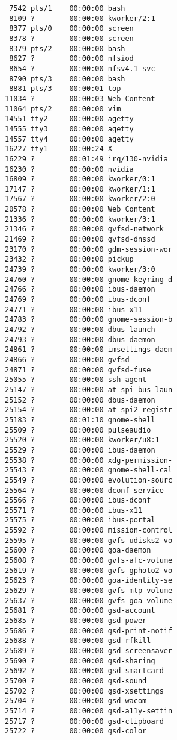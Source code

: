 \documentclass[a4paper]{article}
\begin{document}
\begin{figure}
\begin{verbatim}
 7542 pts/1    00:00:00 bash
 8109 ?        00:00:00 kworker/2:1
 8377 pts/0    00:00:00 screen
 8378 ?        00:00:00 screen
 8379 pts/2    00:00:00 bash
 8627 ?        00:00:00 nfsiod
 8654 ?        00:00:00 nfsv4.1-svc
 8790 pts/3    00:00:00 bash
 8881 pts/3    00:00:01 top
11034 ?        00:00:03 Web Content
11064 pts/2    00:00:00 vim
14551 tty2     00:00:00 agetty
14555 tty3     00:00:00 agetty
14557 tty4     00:00:00 agetty
16227 tty1     00:00:24 X
16229 ?        00:01:49 irq/130-nvidia
16230 ?        00:00:00 nvidia
16809 ?        00:00:00 kworker/0:1
17147 ?        00:00:00 kworker/1:1
17567 ?        00:00:00 kworker/2:0
20578 ?        00:00:00 Web Content
21336 ?        00:00:00 kworker/3:1
21346 ?        00:00:00 gvfsd-network
21469 ?        00:00:00 gvfsd-dnssd
23170 ?        00:00:00 gdm-session-wor
23432 ?        00:00:00 pickup
24739 ?        00:00:00 kworker/3:0
24760 ?        00:00:00 gnome-keyring-d
24766 ?        00:00:00 ibus-daemon
24769 ?        00:00:00 ibus-dconf
24771 ?        00:00:00 ibus-x11
24783 ?        00:00:00 gnome-session-b
24792 ?        00:00:00 dbus-launch
24793 ?        00:00:00 dbus-daemon
24861 ?        00:00:00 imsettings-daem
24866 ?        00:00:00 gvfsd
24871 ?        00:00:00 gvfsd-fuse
25055 ?        00:00:00 ssh-agent
25147 ?        00:00:00 at-spi-bus-laun
25152 ?        00:00:00 dbus-daemon
25154 ?        00:00:00 at-spi2-registr
25183 ?        00:01:10 gnome-shell
25509 ?        00:00:00 pulseaudio
25520 ?        00:00:00 kworker/u8:1
25529 ?        00:00:00 ibus-daemon
25538 ?        00:00:00 xdg-permission-
25543 ?        00:00:00 gnome-shell-cal
25549 ?        00:00:00 evolution-sourc
25564 ?        00:00:00 dconf-service
25566 ?        00:00:00 ibus-dconf
25571 ?        00:00:00 ibus-x11
25575 ?        00:00:00 ibus-portal
25592 ?        00:00:00 mission-control
25595 ?        00:00:00 gvfs-udisks2-vo
25600 ?        00:00:00 goa-daemon
25608 ?        00:00:00 gvfs-afc-volume
25619 ?        00:00:00 gvfs-gphoto2-vo
25623 ?        00:00:00 goa-identity-se
25629 ?        00:00:00 gvfs-mtp-volume
25637 ?        00:00:00 gvfs-goa-volume
25681 ?        00:00:00 gsd-account
25685 ?        00:00:00 gsd-power
25686 ?        00:00:00 gsd-print-notif
25688 ?        00:00:00 gsd-rfkill
25689 ?        00:00:00 gsd-screensaver
25690 ?        00:00:00 gsd-sharing
25692 ?        00:00:00 gsd-smartcard
25700 ?        00:00:00 gsd-sound
25702 ?        00:00:00 gsd-xsettings
25704 ?        00:00:00 gsd-wacom
25714 ?        00:00:00 gsd-a11y-settin
25717 ?        00:00:00 gsd-clipboard
25722 ?        00:00:00 gsd-color

\end{verbatim}
\end{figure}
\end{document}
